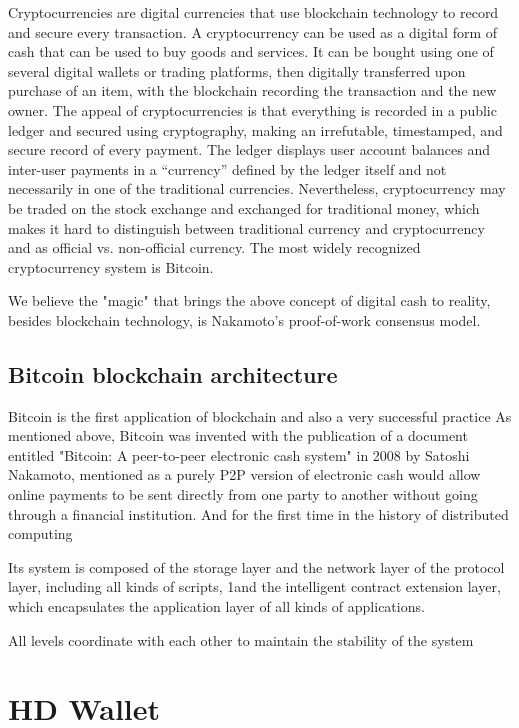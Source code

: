 Cryptocurrencies are digital currencies that use blockchain technology to record and secure every transaction. 
A cryptocurrency can be used as a digital form of cash that can be used to buy goods and services. 
It can be bought using one of several digital wallets or trading platforms, then digitally transferred upon purchase of an item, with the blockchain recording the transaction and the new owner. 
The appeal of cryptocurrencies is that everything is recorded in a public ledger and secured using cryptography, making an irrefutable, timestamped, and secure record of every payment.
The ledger displays user account balances and inter-user payments in a “currency” defined by the ledger itself and not necessarily in one of the traditional currencies. 
Nevertheless, cryptocurrency may be traded on the stock exchange and exchanged for traditional money, which makes it hard to distinguish between traditional currency and cryptocurrency and as official vs. non-official currency. 
The most widely recognized cryptocurrency system is Bitcoin.

We believe the "magic" that brings the above concept of digital cash to reality, besides blockchain technology, is Nakamoto's proof-of-work consensus model.

\subsection{Bitcoin blockchain architecture}
Bitcoin is the first application of blockchain and also a very successful practice
As mentioned above, Bitcoin was invented with the publication of a document entitled "Bitcoin: A peer-to-peer electronic cash system" in 2008 by Satoshi Nakamoto, mentioned as a purely P2P version of electronic cash would allow online payments to be sent directly from one party to another without going through a financial institution.
And for the first time in the history of distributed computing

Its system is composed of the storage layer and the network layer of the protocol layer, including all kinds of scripts, 
1and the intelligent contract extension layer, which encapsulates the application layer of all kinds of applications. 

All levels coordinate with each other to maintain the stability of the system 





\section{HD Wallet}




